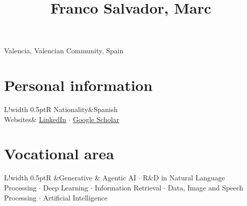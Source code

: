 \documentclass[10pt]{article}
\title{\bfseries\Huge Franco Salvador, Marc}
\date{}
\begin{document}
\begin{minipage}{0.65\textwidth}
\begingroup
\let\center\flushleft
\let\endcenter\endflushleft
\maketitle
\endgroup
\end{minipage}
\begin{minipage}{0.3\textwidth}
\end{minipage}

\begin{minipage}[ht]{0.48\textwidth}
Valencia, Valencian Community, Spain
\end{minipage}



\newcommand\VRule{\color{lightgray}\vrule width 0.5pt}

\section*{Personal information}
\begin{tabular}{L!{\VRule}R}
Nationality&Spanish\vspace{5pt}\\
Websites& \href{https://www.linkedin.com/in/marfrasa/en/}{LinkedIn} $\cdot$ \href{http://scholar.google.com/citations?user=tjhy5T8AAAAJ}{Google Scholar} \\
\end{tabular}

\section*{Vocational area}
\begin{tabular}{L!{\VRule}R}
&Generative \& Agentic AI $\cdot$ R\&D in Natural Language Processing $\cdot$ Deep Learning $\cdot$ Information Retrieval  $\cdot$ Data, Image and Speech Processing $\cdot$ Artificial Intelligence\vspace{5pt}\\
\end{tabular}
\end{document}
